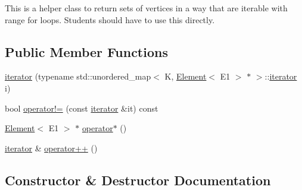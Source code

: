 This is a helper class to return sets of vertices in a way that are iterable with range for loops. Students should have to use this directly. \subsection*{Public Member Functions}
\begin{DoxyCompactItemize}
\item 
\mbox{\hyperlink{classbridges_1_1datastructure_1_1_graph_adj_list_1_1_vertex_element_set__listhelper_1_1iterator_abbd97f84b3192386e6a0cf3c523d1d1a}{iterator}} (typename std\+::unordered\+\_\+map$<$ K, \mbox{\hyperlink{classbridges_1_1datastructure_1_1_element}{Element}}$<$ E1 $>$ $\ast$ $>$\+::\mbox{\hyperlink{classbridges_1_1datastructure_1_1_graph_adj_list_1_1_vertex_element_set__listhelper_1_1iterator}{iterator}} i)
\item 
bool \mbox{\hyperlink{classbridges_1_1datastructure_1_1_graph_adj_list_1_1_vertex_element_set__listhelper_1_1iterator_a1df44cf11b2aeec0c37379f6ccc9ebc0}{operator!=}} (const \mbox{\hyperlink{classbridges_1_1datastructure_1_1_graph_adj_list_1_1_vertex_element_set__listhelper_1_1iterator}{iterator}} \&it) const
\item 
\mbox{\hyperlink{classbridges_1_1datastructure_1_1_element}{Element}}$<$ E1 $>$ $\ast$ \mbox{\hyperlink{classbridges_1_1datastructure_1_1_graph_adj_list_1_1_vertex_element_set__listhelper_1_1iterator_aaa0fd15d94287beda7663ec69e89a42d}{operator$\ast$}} ()
\item 
\mbox{\hyperlink{classbridges_1_1datastructure_1_1_graph_adj_list_1_1_vertex_element_set__listhelper_1_1iterator}{iterator}} \& \mbox{\hyperlink{classbridges_1_1datastructure_1_1_graph_adj_list_1_1_vertex_element_set__listhelper_1_1iterator_aa66d21cb8b5cd0f8fdfc9bcab19cae84}{operator++}} ()
\end{DoxyCompactItemize}


\subsection{Constructor \& Destructor Documentation}
\mbox{\label{classbridges_1_1datastructure_1_1_graph_adj_list_1_1_vertex_element_set__listhelper_1_1iterator_abbd97f84b3192386e6a0cf3c523d1d1a}} 
